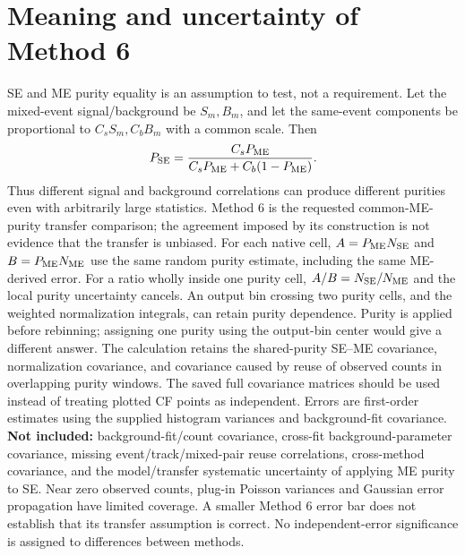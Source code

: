 \documentclass[10pt,a4paper]{article}
\begin{document}
\clearpage\section{Meaning and uncertainty of Method 6}
SE and ME purity equality is an assumption to test, not a requirement. Let the mixed-event signal/background be $S_m,B_m$, and let the same-event components be proportional to $C_sS_m,C_bB_m$ with a common scale. Then
\[P_{\rm SE}=\frac{C_sP_{\rm ME}}{C_sP_{\rm ME}+C_b(1-P_{\rm ME})}.\]
Thus different signal and background correlations can produce different purities even with arbitrarily large statistics. Method 6 is the requested common-ME-purity transfer comparison; the agreement imposed by its construction is not evidence that the transfer is unbiased.
For each native cell, $A=P_{\rm ME}N_{\rm SE}$ and $B=P_{\rm ME}N_{\rm ME}$ use the same random purity estimate, including the same ME-derived error. For a ratio wholly inside one purity cell, $A/B=N_{\rm SE}/N_{\rm ME}$ and the local purity uncertainty cancels. An output bin crossing two purity cells, and the weighted normalization integrals, can retain purity dependence. Purity is applied before rebinning; assigning one purity using the output-bin center would give a different answer.
The calculation retains the shared-purity SE--ME covariance, normalization covariance, and covariance caused by reuse of observed counts in overlapping purity windows. The saved full covariance matrices should be used instead of treating plotted CF points as independent. Errors are first-order estimates using the supplied histogram variances and background-fit covariance.
\textbf{Not included:} background-fit/count covariance, cross-fit background-parameter covariance, missing event/track/mixed-pair reuse correlations, cross-method covariance, and the model/transfer systematic uncertainty of applying ME purity to SE. Near zero observed counts, plug-in Poisson variances and Gaussian error propagation have limited coverage. A smaller Method 6 error bar does not establish that its transfer assumption is correct. No independent-error significance is assigned to differences between methods.
\end{document}

